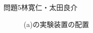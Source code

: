 \documentclass[fleqn]{jbook}
\begin{document}
\begin{answer}{問題5}{林寛仁・太田良介}
\begin{enumerate}
\begin{figure}[h]
		\begin{center}
		\caption{(a)の実験装置の配置}
  		\end{center}
\end{figure}


\end{enumerate}
\end{answer}
\end{document}
